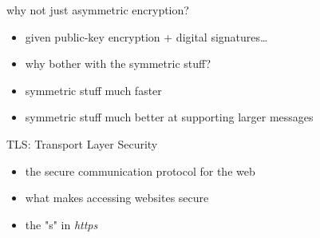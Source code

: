 \begin{frame}{why not just asymmetric encryption?}
    \begin{itemize}
    \item given public-key encryption + digital signatures\ldots
    \item why bother with the symmetric stuff?
    \vspace{.5cm}
    \item symmetric stuff much faster
    \item symmetric stuff much better at supporting larger messages
    \end{itemize}
\end{frame}

\begin{frame}{TLS: Transport Layer Security}
    \begin{itemize}
    \item the secure communication protocol for the web
    \item what makes accessing websites secure
    \item the "s" in \textit{https}
    \end{itemize}
\end{frame}

